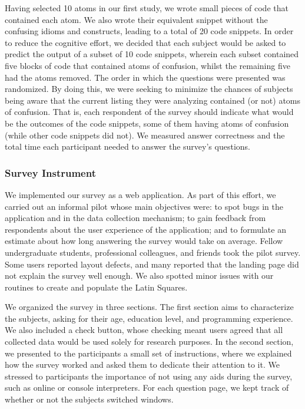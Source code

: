 Having selected 10 atoms in our first study, we wrote small pieces of code that contained each atom. We also wrote their equivalent snippet without the confusing idioms and constructs, leading to a total of 20 code snippets. In order to reduce the cognitive effort, we decided that each subject would be asked to predict the output of a subset of 10 code snippets, wherein each subset contained five blocks of code that contained atoms of confusion, whilst the remaining five had the atoms removed. The order in which the questions were presented was randomized. By doing this, we were seeking to minimize the chances of subjects being aware that the current listing they were analyzing contained (or not) atoms of confusion.
That is, each respondent of the survey should indicate what would be the outcomes of the code snippets, some of them having atoms of confusion (while other code snippets did not). 
We measured answer correctness and the total time each participant needed to answer the survey's questions.

\subsubsection*{Survey Instrument} 

We implemented our survey as a web application. As part of this 
effort, we carried out an informal pilot whose main objectives were: to spot bugs in the application and in the data collection mechanism; to gain feedback from respondents about the user experience of the application; and to formulate an estimate about how long answering the survey would take on average. Fellow undergraduate students, professional colleagues, and friends took the pilot survey. Some users reported layout defects, and many reported that the landing page did not explain the survey well enough. We also spotted minor issues with our routines to create and populate the Latin Squares. 

We organized the survey in three sections. The first section aims to characterize the subjects, asking for their age, education level, and programming experience. We also included a check button, whose checking meant users agreed that all collected data would be used solely for research purposes. In the second section, we presented to the participants a small set of instructions, where we explained how the survey worked and asked them to dedicate their attention to it. We stressed to participants the importance of not using any aids during the survey, such as online or console interpreters. For each question page, we kept track of whether or not the subjects switched windows. 

